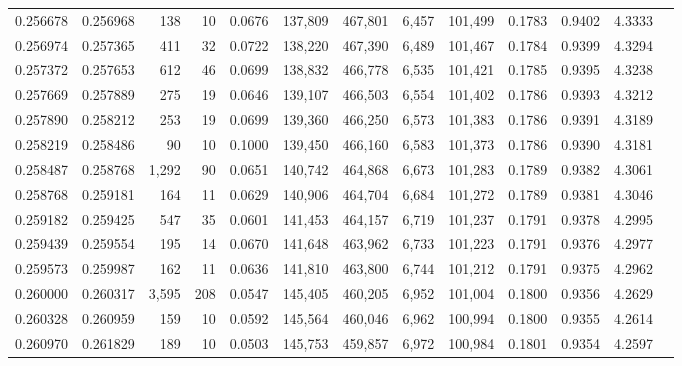 \begin{tabular}{rrrrrrrrrrrrr}
0.256678 & 0.256968 &   138 &  10 &                                     0.0676 & 137,809 & 467,801 &   6,457 & 101,499 & 0.1783 & 0.9402 & 4.3333 \\
0.256974 & 0.257365 &   411 &  32 &                                     0.0722 & 138,220 & 467,390 &   6,489 & 101,467 & 0.1784 & 0.9399 & 4.3294 \\
0.257372 & 0.257653 &   612 &  46 &                                     0.0699 & 138,832 & 466,778 &   6,535 & 101,421 & 0.1785 & 0.9395 & 4.3238 \\
0.257669 & 0.257889 &   275 &  19 &                                     0.0646 & 139,107 & 466,503 &   6,554 & 101,402 & 0.1786 & 0.9393 & 4.3212 \\
0.257890 & 0.258212 &   253 &  19 &                                     0.0699 & 139,360 & 466,250 &   6,573 & 101,383 & 0.1786 & 0.9391 & 4.3189 \\
0.258219 & 0.258486 &    90 &  10 &                                     0.1000 & 139,450 & 466,160 &   6,583 & 101,373 & 0.1786 & 0.9390 & 4.3181 \\
0.258487 & 0.258768 & 1,292 &  90 &                                     0.0651 & 140,742 & 464,868 &   6,673 & 101,283 & 0.1789 & 0.9382 & 4.3061 \\
0.258768 & 0.259181 &   164 &  11 &                                     0.0629 & 140,906 & 464,704 &   6,684 & 101,272 & 0.1789 & 0.9381 & 4.3046 \\
0.259182 & 0.259425 &   547 &  35 &                                     0.0601 & 141,453 & 464,157 &   6,719 & 101,237 & 0.1791 & 0.9378 & 4.2995 \\
0.259439 & 0.259554 &   195 &  14 &                                     0.0670 & 141,648 & 463,962 &   6,733 & 101,223 & 0.1791 & 0.9376 & 4.2977 \\
0.259573 & 0.259987 &   162 &  11 &                                     0.0636 & 141,810 & 463,800 &   6,744 & 101,212 & 0.1791 & 0.9375 & 4.2962 \\
0.260000 & 0.260317 & 3,595 & 208 &                                     0.0547 & 145,405 & 460,205 &   6,952 & 101,004 & 0.1800 & 0.9356 & 4.2629 \\
0.260328 & 0.260959 &   159 &  10 &                                     0.0592 & 145,564 & 460,046 &   6,962 & 100,994 & 0.1800 & 0.9355 & 4.2614 \\
0.260970 & 0.261829 &   189 &  10 &                                     0.0503 & 145,753 & 459,857 &   6,972 & 100,984 & 0.1801 & 0.9354 & 4.2597 \\

\end{tabular}
